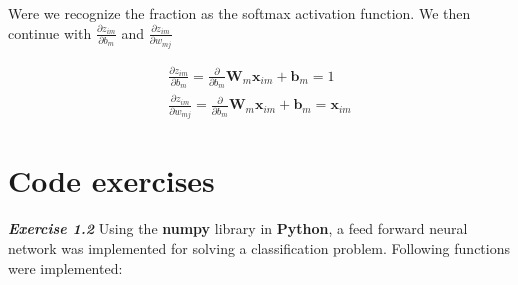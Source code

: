 \documentclass[a4paper,10pt]{article}
\begin{document}
Were we recognize the fraction as the softmax activation function. We then continue with $\frac{\partial z_{im}} {\partial b_{m}}$ and $\frac{\partial z_{im}} {\partial w_{mj}}$ 

    \begin{equation}
    \begin{aligned}
         \frac{\partial z_{im}} {\partial b_{m}} = \frac{\partial} {\partial b_{m}} \textbf{W}_m\textbf{x}_{im} + \textbf{b}_m = 1 \\
         \frac{\partial z_{im}} {\partial w_{mj}} = \frac{\partial} {\partial b_{m}} \textbf{W}_m\textbf{x}_{im} + \textbf{b}_m = \textbf{x}_{im}
    \end{aligned}
    \end{equation}

\section{Code exercises}

\textit{\textbf{Exercise 1.2}}
Using the \textbf{numpy} library in \textbf{Python}, a feed forward neural network was implemented for solving a classification problem. Following functions were implemented: 
\end{document}

